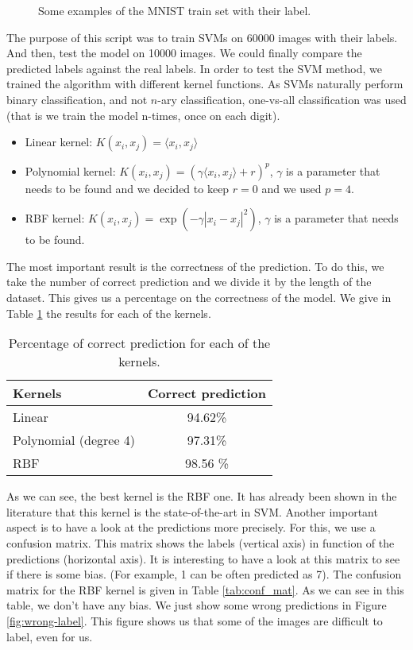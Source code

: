 \documentclass[a4paper, 11pt]{article}
\begin{document}
\begin{figure}[H]
\centering

\caption{\label{fig:train-set} Some examples of the MNIST train set with their label.}
\end{figure}

The purpose of this script was to train SVMs on 60000 images with their
labels. And then, test the model on 10000 images. We could finally compare the
predicted labels against the real labels. In order to test the SVM method, we
trained the algorithm with different kernel functions. As SVMs naturally perform
binary classification, and not $n$-ary classification, one-vs-all classification
was used (that is we train the model n-times, once on each digit).
\begin{itemize}
\item Linear kernel: $K(x_i,x_j) = \langle x_i, x_j \rangle$
\item Polynomial kernel: $K(x_i,x_j) = (\gamma \langle x_i, x_j \rangle + r)^p$, $\gamma$ is a parameter that needs to be found and we decided to keep $r=0$ and we used $p=4$.
\item RBF kernel:  $K(x_i,x_j) = \exp(-\gamma|x_i-x_j|^2)$, $\gamma$ is a parameter that needs to be found.
\end{itemize} 

The most important result is the correctness of the prediction. To do this, we
take the number of correct prediction and we divide it by the length of the
dataset. This gives us a percentage on the correctness of the model. We give in
Table \ref{tab:correct} the results for each of the kernels.

\begin{table}[H]
\centering
\begin{tabular}{l|c}
Kernels & Correct prediction \\
\hline
Linear & 94.62\% \\
Polynomial (degree 4) & 97.31\% \\ 
RBF & 98.56 \% \\ 
\end{tabular}
\caption{\label{tab:correct} Percentage of correct prediction for each of the kernels.}
\end{table}

As we can see, the best kernel is the RBF one. It has already been shown in the
literature that this kernel is the state-of-the-art in SVM. Another important
aspect is to have a look at the predictions more precisely. For this, we use a
confusion matrix. This matrix shows the labels (vertical axis) in function of
the predictions (horizontal axis). It is interesting to have a look at this
matrix to see if there is some bias. (For example, 1 can be often predicted as
7). The confusion matrix for the RBF kernel is given in Table
\ref{tab:conf_mat}. As we can see in this table, we don't have any bias. We
just show some wrong predictions in Figure \ref{fig:wrong-label}. This figure
shows us that some of the images are difficult to label, even for us.
\end{document}
